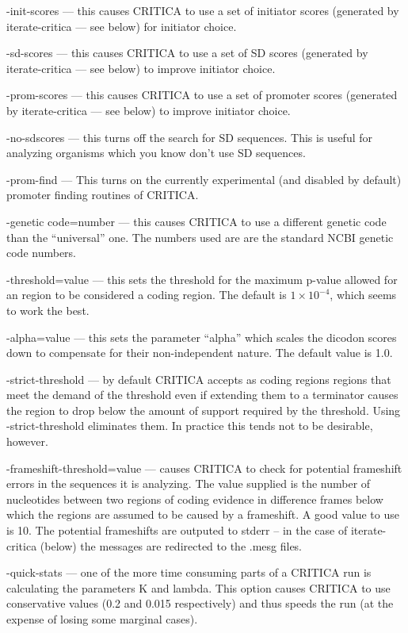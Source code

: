 \documentclass{article}
\begin{document}
\bigskip \noindent -init-scores --- this causes CRITICA to use
a set of initiator scores (generated by iterate-critica ---
see below) for initiator choice.

\bigskip \noindent -sd-scores --- this causes CRITICA to use a
set of SD scores (generated by iterate-critica --- see
below) to improve initiator choice.

\bigskip \noindent -prom-scores --- this causes CRITICA to use a
set of promoter scores (generated by iterate-critica --- see
below) to improve initiator choice.

\bigskip \noindent -no-sdscores --- this turns off the search
for SD sequences. This is useful for analyzing organisms which you
know don't use SD sequences.

\bigskip \noindent -prom-find --- This turns on the currently
experimental (and disabled by default) promoter finding routines of
CRITICA.

\bigskip \noindent -genetic code=number --- this causes CRITICA
to use a different genetic code than the ``universal'' one. The
numbers used are are the standard NCBI genetic code numbers.

\bigskip \noindent -threshold=value --- this sets the threshold
for the maximum p-value allowed for an region to be considered a
coding region. The default is $1\times 10^{-4}$, which seems to work
the best.

\bigskip \noindent -alpha=value --- this sets the parameter
``alpha'' which scales the dicodon scores down to compensate for their
non-independent nature. The default value is 1.0.

\bigskip \noindent -strict-threshold --- by default CRITICA
accepts as coding regions regions that meet the demand of the
threshold even if extending them to a terminator causes the region to
drop below the amount of support required by the threshold. Using
-strict-threshold eliminates them. In practice this tends not
to be desirable, however.

\bigskip \noindent -frameshift-threshold=value --- causes
CRITICA to check for potential frame\-shift errors in the sequences it
is analyzing. The value supplied is the number of nucleotides between
two regions of coding evidence in difference frames below which the
regions are assumed to be caused by a frameshift. A good value to use
is 10. The potential frameshifts are outputed to stderr -- in the
case of iterate-critica (below) the messages are redirected to
the .mesg files.

\bigskip \noindent -quick-stats --- one of the more time
consuming parts of a CRITICA run is calculating the parameters K and
lambda. This option causes CRITICA to use conservative values (0.2
and 0.015 respectively) and thus speeds the run (at the expense of
losing some marginal cases).
\end{document}
